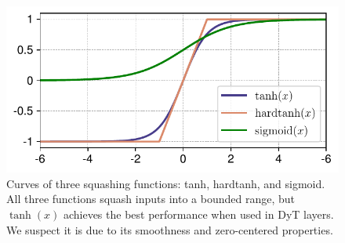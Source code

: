 \begin{figure}[t]
\vspace{-0.3in}
\centering
\begin{minipage}{0.39\textwidth}
\centering
\vspace{0.05cm}
\includegraphics[width=0.96\linewidth]{figures/hardtanh_plot.pdf}
\vspace{0.3cm}
\caption{Curves of three squashing functions: tanh, hardtanh, and sigmoid. All three functions squash inputs into a bounded range, but $\tanh(x)$ achieves the best performance when used in DyT layers. We suspect it is due to its smoothness and zero-centered properties.}


\end{minipage}
\end{figure}
